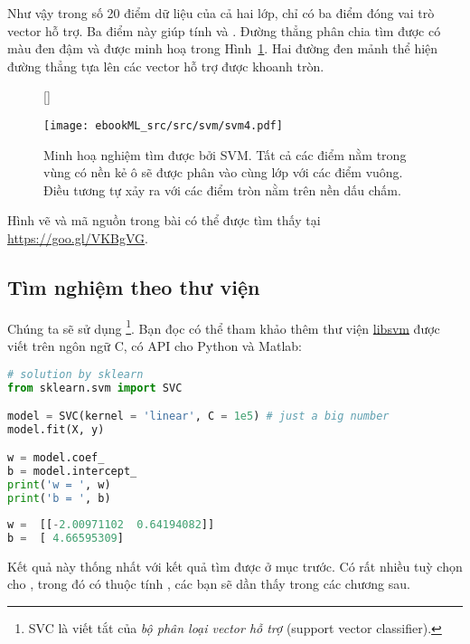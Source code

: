 Như vậy trong số 20 điểm dữ liệu của cả hai lớp, chỉ có ba điểm đóng vai trò  vector hỗ trợ. Ba điểm này giúp tính  và
. 
Đường thẳng phân chia tìm được có màu đen đậm và được minh hoạ trong Hình~\ref{fig:svmf5}. Hai đường đen mảnh thể hiện
đường thẳng {tựa} lên các vector hỗ trợ được khoanh tròn. 
 

\begin{figure}[t]
    [\FBwidth]
    {\caption{ 
    Minh hoạ nghiệm tìm được bởi SVM. Tất cả các điểm nằm trong vùng có nền kẻ ô sẽ được phân vào cùng lớp với các điểm vuông. Điều tương tự xảy 
    ra với các điểm tròn nằm trên nền dấu chấm.
    }
    \label{fig:svmf5}}
    { %
    \texttt{[image: ebookML\_src/src/svm/svm4.pdf]}
    }
\end{figure}


Hình vẽ và mã nguồn trong bài có thể được tìm thấy tại \url{https://goo.gl/VKBgVG}.
 

 
\subsection{Tìm nghiệm theo thư viện}
Chúng ta sẽ sử dụng \href{http://scikit-learn.org/stable/modules/generated/sklearn.svm.SVC.html}{}\footnote{SVC là viết tắt của \textit{bộ phân loại vector hỗ trợ} (support vector classifier).}. Bạn đọc có thể tham khảo thêm thư viện \href{https://www.csie.ntu.edu.tw/~cjlin/libsvm/}{libsvm} được viết trên ngôn ngữ C, có API cho Python và Matlab:

\begin{lstlisting}[language=Python]
# solution by sklearn 
from sklearn.svm import SVC

model = SVC(kernel = 'linear', C = 1e5) # just a big number 
model.fit(X, y) 

w = model.coef_
b = model.intercept_
print('w = ', w)
print('b = ', b)
\end{lstlisting}
\kq
\begin{lstlisting}[language=Python]
w =  [[-2.00971102  0.64194082]]
b =  [ 4.66595309]
\end{lstlisting}
 
Kết quả này thống nhất với kết quả tìm được ở mục trước. Có rất nhiều tuỳ chọn cho , trong đó có thuộc tính
, các bạn sẽ dần thấy trong các chương sau.
 
